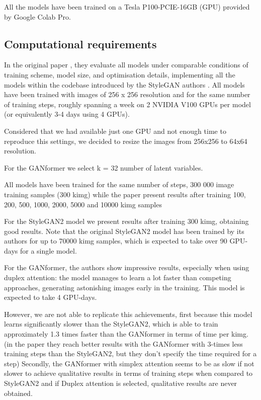 \documentclass{article}
\begin{document}
	All the models have been trained on a Tesla P100-PCIE-16GB (GPU) provided by Google 
	Colab Pro.
	
	\subsection{Computational requirements}
	
	In the original paper \cite{hudson2021generative}, they evaluate all models under comparable 
	conditions of training scheme, model size, and optimisation details, implementing all the models 
	within the codebase introduced by the StyleGAN authors \cite{karras2020analyzing}. 
	All models have been trained with images of 256 x 256 resolution and for the 
	same number of training steps, roughly spanning a week on 2 NVIDIA V100 GPUs per model (or 
	equivalently 3-4 days using 4 GPUs). 
	
	Considered that we had available just one GPU and not enough time to reproduce this settings, we 
	decided to resize the images from 256x256 to 64x64 resolution.
	
	
	For the GANformer we select k = 32 number of latent variables. 
	
	All models have been trained for the same number of steps, 300 000 image
	training samples (300 kimg) while the paper present results after training 100, 200, 500, 1000, 2000, 
	5000 and 10000 kimg samples
	
	For the StyleGAN2 model we present results after training 300 kimg, obtaining 
	good results.
	Note that the original StyleGAN2 model has been trained by its authors \cite{karras2020analyzing} 
	for up to 70000 kimg samples, which is expected to take over 90 GPU-days for a single model. 
	
	
	For the GANformer, the authors \cite{karras2020analyzing} show impressive results, especially when 
	using duplex attention: the model manages to learn a lot faster than competing approaches, 
	generating astonishing images early in the training. This model is expected to take 4 GPU-days.
	
	However, we are not able to replicate this achievements, first because this model learns significantly 
	slower than the StyleGAN2, which is able to train approximately 
	1.3 times faster than the GANformer in terms of time per kimg.
	(in the paper they reach better results with the GANformer with 3-times less training steps than the 
	StyleGAN2, but they don't specify the time required for a step)
	Secondly, the GANformer with simplex attention seems to be as slow if not slower to achieve 
	qualitative results
	in terms of training steps when compared to StyleGAN2 and if Duplex attention is selected, 
	qualitative results are never obtained.
	
\end{document}
